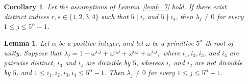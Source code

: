 \documentclass[12pt]{article}
\newtheorem{lemA}[propA]{Lemma}
\newtheorem{corA}[propA]{Corollary}
\begin{document}
 \begin{corA}
 	Let the assumptions of Lemma~\ref{lemb_7} hold. If there exist distinct indices $r,s\in\{1,2,3,4\}$ such that $5\mid i_r$ and $5\nmid i_s$, then
 	$
 	\lambda_j\neq0
 	$
 	for every $1\le j\le5^\alpha-1$.
 \end{corA}
  \begin{lemA}\label{lemb_8}
  	Let $\alpha$ be a positive integer, and let $\omega$ be a primitive $5^\alpha$-th root of unity. Suppose that
  	$
  	\lambda_j=1+\omega^{i_1j}+\omega^{i_2j}+\omega^{i_3j}+\omega^{i_4j},
  	$
  	where $i_1,i_2,i_3$, and $i_4$ are pairwise distinct, $i_3$ and $i_4$ are divisible by $5$, whereas $i_1$ and $i_2$ are not divisible by $5$, and
  	$
  	1\le i_1,i_2,i_3,i_4\le 5^\alpha-1.
  	$
  	Then
  	$
  	\lambda_j\neq0
  	$
  	for every
  	$
  	1\le j\le 5^\alpha-1.
  	$
  \end{lemA}
\end{document}

